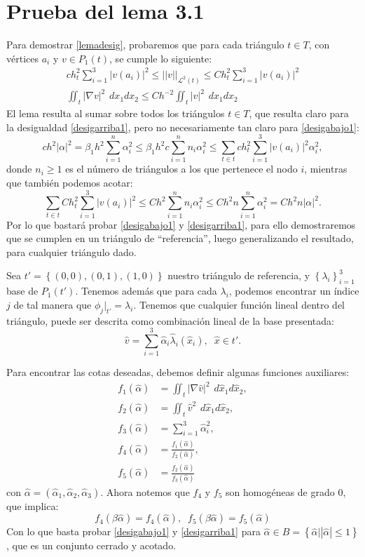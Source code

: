 \documentclass[12pt,spanish,oneside]{book}
\theoremstyle{plain}
\numberwithin{equation}{chapter}
\theoremstyle{definition}
\theoremstyle{remark}
\newcommand{\LD}{\mathcal{L}^2}
\newcommand{\dxhat}{\hspace{5pt} d\hat{x}_1d\hat{x}_2}
\newcommand{\dxt}{\hspace{5pt} dx_1dx_2}
\newcommand{\llaves}[1]{\left\lbrace #1\right\rbrace}
\begin{document}
\chapter{Prueba del lema 3.1 }\label{AN2}

Para demostrar \ref{lemadesig}, probaremos que para cada triángulo $t\in T$, con vértices $a_i$ y $v\in P_1(t)$, se cumple lo siguiente:
\begin{eqnarray}
ch_t^2\sum_{i=1}^3|v(a_i)|^2\leq ||v||_{\LD(t)}\leq Ch_t^2\sum_{i=1}^3|v(a_i)|^2\label{desigabajo1}\\
\iint_t|\nabla v|^2 \dxt\leq Ch^{-2} \iint_t |v|^2\dxt\label{desigarriba1}
\end{eqnarray}
El lema resulta al sumar sobre todos los triángulos $t\in T$, que resulta claro para la desigualdad \ref{desigarriba1}, pero no necesariamente tan claro para \ref{desigabajo1}:
\[ch^2|\alpha|^2=\beta_1h^2\sum_{i=1}^n\alpha_i^2\leq \beta_1h^2c\sum_{i=1}^nn_i\alpha_i^2\leq \sum_{t\in t}ch_t^2\sum_{i=1}^3|v(a_i)|^2 \alpha_i^2,\]donde $n_i\geq1$ es el número de triángulos a los que pertenece el nodo $i$, mientras que también podemos acotar: 
\[\sum_{t\in t}Ch_t^2\sum_{i=1}^3|v(a_i)|^2\leq Ch^2\sum_{i=1}^n n_i\alpha_i^2\leq Ch^2n\sum_{i=1}^n\alpha_i^2=Ch^2n|\alpha|^2.\]
Por lo que bastará probar \ref{desigabajo1} y \ref{desigarriba1}, para ello demostraremos que se cumplen en un triángulo de ``referencia'', luego generalizando el resultado, para cualquier triángulo dado.

Sea $t'=\llaves{(0,0),(0,1),(1,0)}$ nuestro triángulo de referencia, y $\llaves{\lambda_i}_{i=1}^3$ base de $P_1(t')$. Tenemos además que para cada $\lambda_i$, podemos encontrar un índice $j$ de tal manera que $\phi_j\big|_{t'}=\lambda_i$. Tenemos que cualquier función lineal dentro del triángulo, puede ser descrita como combinación lineal de la base presentada: $$\hat{v}=\sum_{i=1}^3\hat{\alpha}_i\hat{\lambda}_i (\hat{x}_i), \phantom{\pi}\hat{x}\in t'.$$ 

Para encontrar las cotas deseadas, debemos definir algunas funciones auxiliares:
\begin{align}
 f_1(\hat{\alpha})&=\iint_t|\nabla\hat{v}|^2 \dxhat, \\
 f_2(\hat{\alpha})&=\iint_t\hat{v}^2 \dxhat, \\
 f_3(\hat{\alpha})&=\sum_{i=1}^3\hat{\alpha}_i^2, \\
 f_4(\hat{\alpha})&=\frac{f_1(\hat{\alpha})}{f_2(\hat{\alpha})},\phantom{\pi}\\
 f_5(\hat{\alpha})&=\frac{f_2(\hat{\alpha})}{f_3(\hat{\alpha})}
\end{align}
con $\hat{\alpha}=(\hat{\alpha}_1,\hat{\alpha}_2,\hat{\alpha}_3)$. Ahora notemos que $f_4$ y $f_5$ son homogéneas de grado 0, que implica: 
\[ f_4(\beta \hat{\alpha})=f_4(\hat{\alpha}),\phantom{\pi}f_5(\beta \hat{\alpha})=f_5(\hat{\alpha})\]
Con lo que basta probar \ref{desigabajo1} y \ref{desigarriba1} para $\hat{\alpha}\in B=\llaves{\hat{\alpha}\big||\hat{\alpha}|\leq 1}$, que es un conjunto cerrado y acotado. 
\end{document}
